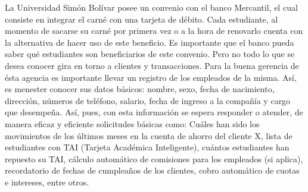 \documentclass[12pt,a4paper,spanish]{article}
\begin{document}
\newline
\indent La Universidad Sim\'on Bol\'ivar posee un convenio con el banco Mercantil, el cual consiste en integrar el carn\'e con una tarjeta de d\'ebito. Cada estudiante, al momento de sacarse su carn\'e por primera vez o a la hora de renovarlo cuenta con la alternativa de hacer uso de este beneficio. Es importante que el banco pueda saber qu\'e estudiantes son beneficiarios de este convenio.
\newline
\indent Pero no todo lo que se desea conocer gira en torno a clientes y transacciones. Para la buena gerencia de \'esta agencia es importante llevar un registro de los empleados de la misma. As\'i, es menester conocer sus datos b\'asicos: nombre, sexo, fecha de nacimiento, direcci\'on, n\'umeros de tel\'efono, salario, fecha de ingreso a la compa\~n\'ia y cargo que desempe\~na. 
\newline
\indent As\'i, pues, con esta informaci\'on se espera responder o atender, de manera eficaz y eficiente solicitudes b\'asicas como: Cu\'ales han sido los movimientos de los \'ultimos meses en la cuenta de ahorro del cliente X, lista de estudiantes con TAI (Tarjeta Acad\'emica Inteligente), cu\'antos estudiantes han repuesto su TAI, c\'alculo autom\'atico de comisiones para los empleados (si aplica), recordatorio de fechas de cumplea\~nos de los clientes, cobro autom\'atico de cuotas e intereses, entre otros. 
\end{document}
